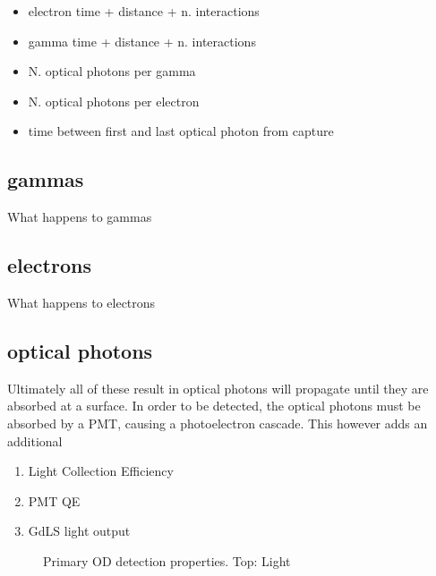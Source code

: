 \begin{itemize}
    \item electron time + distance + n. interactions
    \item gamma time + distance + n. interactions
    \item N. optical photons per gamma
    \item N. optical photons per electron
    \item time between first and last optical photon from capture
\end{itemize}

\subsection{gammas}
\par
What happens to gammas



\subsection{electrons}
\par
What happens to electrons


\subsection{optical photons}
\par
Ultimately all of these result in optical photons will propagate until they are absorbed at a surface.
In order to be detected, the optical photons must be absorbed by a PMT, causing a photoelectron cascade.
This however adds an additional 

\begin{tcolorbox}[colback=red!5!white, colframe=red!50!black, title=Key Plots]
\begin{enumerate}
    \item Light Collection Efficiency
    \item PMT QE
    \item GdLS light output
\end{enumerate}
\end{tcolorbox}


\begin{figure}[!htbp]%
\centering
{}
\caption{Primary OD detection properties. Top: Light 
}
\label{fig:od_detection_properties}
\end{figure}


